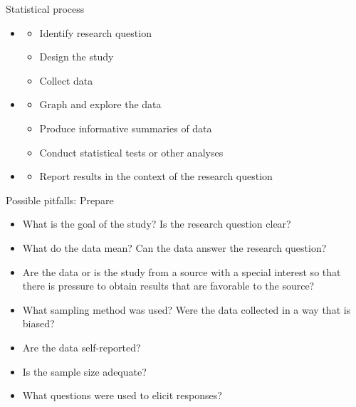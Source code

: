 \documentclass[xcolor=table, aspectratio=169, bigger]{beamer}
\begin{document}
\begin{frame}{Statistical process}
\begin{block}{}
\begin{itemize}
\item<1-> 
\begin{itemize}
\item<2-> Identify research question
\item<2-> Design the study
\item<2-> Collect data
\end{itemize}
\item<1-> 
\begin{itemize}
\item<3-> Graph and explore the data
\item<3-> Produce informative summaries of data
\item<3-> Conduct statistical tests or other analyses
\end{itemize}
\item<1-> 
\begin{itemize}
\item<4-> Report results in the context of the research question
\end{itemize}
\end{itemize}
\end{block}

\end{frame}


\begin{frame}{Possible pitfalls: Prepare}
\begin{block}{}
\begin{itemize}
\item What is the goal of the study? Is the research question clear?
\item What do the data mean? Can the data answer the research question?
\item Are the data or is the study from a source with a special interest so that there is pressure to obtain results that are favorable to the source?
\item What sampling method was used? Were the data collected in a way that is biased?
\item Are the data self-reported?
\item Is the sample size adequate?
\item What questions were used to elicit responses?
\end{itemize}
\end{block}
\end{frame}
\end{document}
